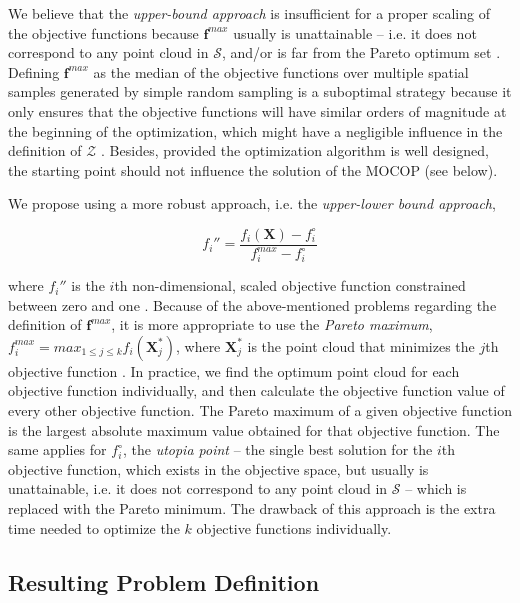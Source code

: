 We believe that the \emph{upper-bound approach} is insufficient for a proper scaling of the objective 
functions because $\boldsymbol{f}^{max}$ usually is unattainable -- i.e. it does not correspond to any point 
cloud in $\mathcal{S}$, and/or is far from the Pareto optimum set \cite{MarlerEtAl2004}. Defining 
$\boldsymbol{f}^{max}$ as the median of the objective functions over multiple spatial samples generated by 
simple random sampling \cite{CliffordEtAl2014} is a suboptimal strategy because it only ensures that the 
objective functions will have similar orders of magnitude at the beginning of the optimization, which might 
have a negligible influence in the definition of $\mathcal{Z}$ \cite{MarlerEtAl2005}. Besides, provided the 
optimization algorithm is well designed, the starting point should not influence the solution of the MOCOP 
(see below).

We propose using a more robust approach, i.e. the \emph{upper-lower bound approach},

\begin{equation}
 f_i'' = \frac{f_i(\boldsymbol{X}) - f_i^{\circ}}{f_i^{max} - f_i^{\circ}}
\end{equation}

\nointent where $f_i''$ is the $i$th non-dimensional, scaled objective function constrained between zero 
and one \cite{MarlerEtAl2005}. Because of the above-mentioned problems regarding the definition of 
$\boldsymbol{f}^{max}$, it is more appropriate to use the \emph{Pareto maximum}, $f_i^{max} = max_{1 \leq j 
\leq k} f_ i(\boldsymbol{X}_j^*)$, where $\boldsymbol{X}_j^*$ is the point cloud that minimizes the $j$th 
objective function \cite{MarlerEtAl2005}. In practice, we find the optimum point cloud for each objective 
function individually, and then calculate the objective function value of every other objective function. The 
Pareto maximum of a given objective function is the largest absolute maximum value obtained for that objective 
function. The same applies for $f_i^{\circ}$, the \emph{utopia point} -- the single best solution for the 
$i$th objective function, which exists in the objective space, but usually is unattainable, i.e. it does not 
correspond to any point cloud in $\mathcal{S}$ \cite{Arora2011} -- which is replaced with the Pareto 
minimum. The drawback of this approach is the extra time needed to optimize the $k$ objective functions 
individually.

\subsection{Resulting Problem Definition}

